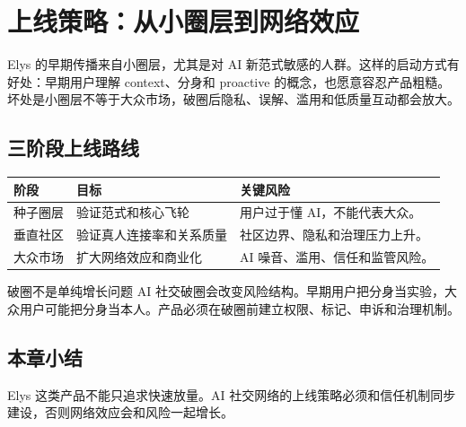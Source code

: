 \section{上线策略：从小圈层到网络效应}

Elys 的早期传播来自小圈层，尤其是对 AI 新范式敏感的人群。这样的启动方式有好处：早期用户理解 context、分身和 proactive 的概念，也愿意容忍产品粗糙。坏处是小圈层不等于大众市场，破圈后隐私、误解、滥用和低质量互动都会放大。

\subsection{三阶段上线路线}

\noindent\begin{tabularx}{\textwidth}{p{}p{}X}
\toprule
阶段 & 目标 & 关键风险 \\
\midrule
种子圈层 & 验证范式和核心飞轮 & 用户过于懂 AI，不能代表大众。 \\
垂直社区 & 验证真人连接率和关系质量 & 社区边界、隐私和治理压力上升。 \\
大众市场 & 扩大网络效应和商业化 & AI 噪音、滥用、信任和监管风险。 \\
\bottomrule
\end{tabularx}

\begin{importantbox}{破圈不是单纯增长问题}
AI 社交破圈会改变风险结构。早期用户把分身当实验，大众用户可能把分身当本人。产品必须在破圈前建立权限、标记、申诉和治理机制。
\end{importantbox}

\subsection{本章小结}

Elys 这类产品不能只追求快速放量。AI 社交网络的上线策略必须和信任机制同步建设，否则网络效应会和风险一起增长。

